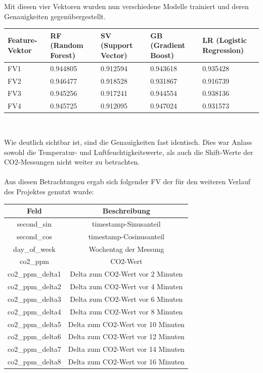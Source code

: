 Mit diesen vier Vektoren wurden nun verschiedene Modelle trainiert und deren Genauigkeiten gegenübergestellt.

\begin{center}
    \begin{tabular}{|p{1.5cm}||p{3cm}| p{3cm}| p{3cm}| p{3cm}|} 
        \hline
        Feature-Vektor&RF (Random Forest) &SV (Support Vector)&GB (Gradient Boost)&LR (Logistic Regression)\\ [0.5ex] 
        \hline\hline
        FV1&0.944805&	0.912594&	0.943618&	0.935428\\
        \hline
        FV2&0.946477&	0.918528&	0.931867&	0.916739\\
        \hline
        FV3&0.945256&	0.917241&	0.944554&	0.938136\\
        \hline
        FV4&0.945725&	0.912095&	0.947024&	0.931573\\
        \hline
    \end{tabular}\\        
\end{center}

Wie deutlich sichtbar ist, sind die Genauigkeiten fast identisch. Dies war Anlass sowohl die Temperatur- und 
Luftfeuchtigkeitswerte, als auch die Shift-Werte der CO2-Messungen nicht weiter zu betrachten.\\\\
\newpage
Aus diesen Betrachtungen ergab sich folgender FV der für den weiteren Verlauf des Projektes genutzt wurde:\\

\begin{center}
    \begin{tabular}{ |c||c| } 
     \hline
     Feld & Beschreibung \\ 
     \hline\hline
     second\_sin & timestamp-Sinusanteil\\
     second\_cos & timestamp-Cosinusanteil\\
     day\_of\_week & Wochentag der Messung\\
     co2\_ppm & CO2-Wert\\ 
     co2\_ppm\_delta1 & Delta zum CO2-Wert vor 2 Minuten\\ 
     co2\_ppm\_delta2 & Delta zum CO2-Wert vor 4 Minuten\\ 
     co2\_ppm\_delta3 & Delta zum CO2-Wert vor 6 Minuten\\ 
     co2\_ppm\_delta4 & Delta zum CO2-Wert vor 8 Minuten\\ 
     co2\_ppm\_delta5 & Delta zum CO2-Wert vor 10 Minuten\\ 
     co2\_ppm\_delta6 & Delta zum CO2-Wert vor 12 Minuten\\ 
     co2\_ppm\_delta7 & Delta zum CO2-Wert vor 14 Minuten\\ 
     co2\_ppm\_delta8 & Delta zum CO2-Wert vor 16 Minuten\\ 
     \hline
    \end{tabular}
\end{center}

